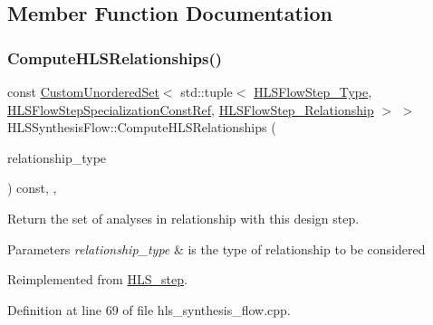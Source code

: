 \subsection{Member Function Documentation}
\mbox{\label{classHLSSynthesisFlow_ab50e0c7e5ddf4bc0e977f2fb2d1b3d21}} 
\subsubsection{\texorpdfstring{Compute\+H\+L\+S\+Relationships()}{ComputeHLSRelationships()}}
{\footnotesize\ttfamily const \hyperlink{classCustomUnorderedSet}{Custom\+Unordered\+Set}$<$ std\+::tuple$<$ \hyperlink{hls__step_8hpp_ada16bc22905016180e26fc7e39537f8d}{H\+L\+S\+Flow\+Step\+\_\+\+Type}, \hyperlink{hls__step_8hpp_a5fdd2edf290c196531d21d68e13f0e74}{H\+L\+S\+Flow\+Step\+Specialization\+Const\+Ref}, \hyperlink{hls__step_8hpp_a3ad360b9b11e6bf0683d5562a0ceb169}{H\+L\+S\+Flow\+Step\+\_\+\+Relationship} $>$ $>$ H\+L\+S\+Synthesis\+Flow\+::\+Compute\+H\+L\+S\+Relationships (\begin{DoxyParamCaption}\item[{const \hyperlink{classDesignFlowStep_a723a3baf19ff2ceb77bc13e099d0b1b7}{Design\+Flow\+Step\+::\+Relationship\+Type}}]{relationship\+\_\+type }\end{DoxyParamCaption}) const\hspace{0.3cm}{\ttfamily [override]}, {\ttfamily [protected]}, {\ttfamily [virtual]}}



Return the set of analyses in relationship with this design step. 


\begin{DoxyParams}{Parameters}
{\em relationship\+\_\+type} & is the type of relationship to be considered \\
\hline
\end{DoxyParams}


Reimplemented from \hyperlink{classHLS__step_aed0ce8cca9a1ef18e705fc1032ad4de5}{H\+L\+S\+\_\+step}.



Definition at line 69 of file hls\+\_\+synthesis\+\_\+flow.\+cpp.



